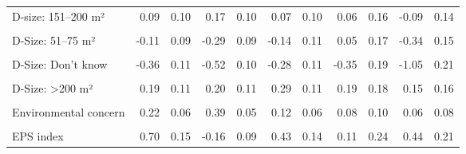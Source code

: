 \begin{table}
\begin{tabular}[t]{lrrrrrrrrrr}
D-size: 151–200 m² & 0.09 & 0.10 & 0.17 & 0.10 & 0.07 & 0.10 & 0.06 & 0.16 & -0.09 & 0.14\\
\cellcolor{gray!10}{D-Size: 26–50 m²} & \cellcolor{gray!10}{-0.09} & \cellcolor{gray!10}{0.12} & \cellcolor{gray!10}{-0.17} & \cellcolor{gray!10}{0.11} & \cellcolor{gray!10}{-0.01} & \cellcolor{gray!10}{0.14} & \cellcolor{gray!10}{-0.07} & \cellcolor{gray!10}{0.23} & \cellcolor{gray!10}{-0.44} & \cellcolor{gray!10}{0.20}\\
D-Size: 51–75 m² & -0.11 & 0.09 & -0.29 & 0.09 & -0.14 & 0.11 & 0.05 & 0.17 & -0.34 & 0.15\\
\cellcolor{gray!10}{D-Size: 76–100 m²} & \cellcolor{gray!10}{-0.19} & \cellcolor{gray!10}{0.08} & \cellcolor{gray!10}{-0.12} & \cellcolor{gray!10}{0.08} & \cellcolor{gray!10}{-0.12} & \cellcolor{gray!10}{0.09} & \cellcolor{gray!10}{-0.01} & \cellcolor{gray!10}{0.15} & \cellcolor{gray!10}{-0.18} & \cellcolor{gray!10}{0.13}\\
D-Size: Don't know & -0.36 & 0.11 & -0.52 & 0.10 & -0.28 & 0.11 & -0.35 & 0.19 & -1.05 & 0.21\\
\cellcolor{gray!10}{D-Size: <25 m²} & \cellcolor{gray!10}{-0.42} & \cellcolor{gray!10}{0.24} & \cellcolor{gray!10}{-1.04} & \cellcolor{gray!10}{0.25} & \cellcolor{gray!10}{-0.43} & \cellcolor{gray!10}{0.28} & \cellcolor{gray!10}{0.31} & \cellcolor{gray!10}{0.35} & \cellcolor{gray!10}{-0.52} & \cellcolor{gray!10}{0.37}\\
D-Size: >200 m² & 0.19 & 0.11 & 0.20 & 0.11 & 0.29 & 0.11 & 0.19 & 0.18 & 0.15 & 0.16\\
\cellcolor{gray!10}{D-Location: Rural} & \cellcolor{gray!10}{0.11} & \cellcolor{gray!10}{0.06} & \cellcolor{gray!10}{0.06} & \cellcolor{gray!10}{0.06} & \cellcolor{gray!10}{0.09} & \cellcolor{gray!10}{0.07} & \cellcolor{gray!10}{0.19} & \cellcolor{gray!10}{0.11} & \cellcolor{gray!10}{0.21} & \cellcolor{gray!10}{0.10}\\
Environmental concern & 0.22 & 0.06 & 0.39 & 0.05 & 0.12 & 0.06 & 0.08 & 0.10 & 0.06 & 0.08\\
\cellcolor{gray!10}{Government support} & \cellcolor{gray!10}{10.27} & \cellcolor{gray!10}{2.49} & \cellcolor{gray!10}{9.74} & \cellcolor{gray!10}{2.49} & \cellcolor{gray!10}{10.64} & \cellcolor{gray!10}{2.64} & \cellcolor{gray!10}{12.03} & \cellcolor{gray!10}{2.89} & \cellcolor{gray!10}{12.86} & \cellcolor{gray!10}{3.79}\\
EPS index & 0.70 & 0.15 & -0.16 & 0.09 & 0.43 & 0.14 & 0.11 & 0.24 & 0.44 & 0.21\\

\end{tabular}
\end{table}
